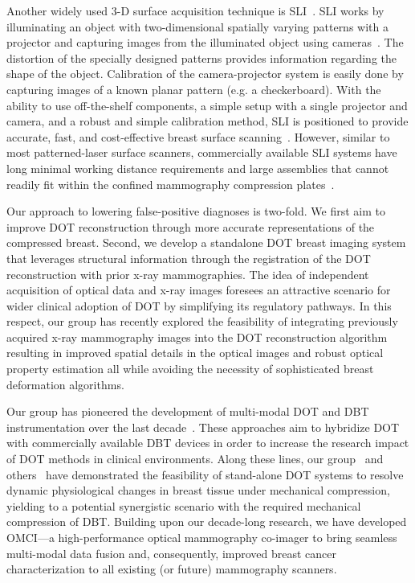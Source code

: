 Another widely used 3-D surface acquisition technique is \ac{SLI}~\cite{Yang2020, Zhang2018}. \ac{SLI} works by illuminating an object with two-dimensional spatially varying patterns with a projector and capturing images from the illuminated object using cameras~\cite{Geng2011}. The distortion of the specially designed patterns provides information regarding the shape of the object. Calibration of the camera-projector system is easily done by capturing images of a known planar pattern (e.g. a checkerboard). With the ability to use off-the-shelf components, a simple setup with a single projector and camera, and a robust and simple calibration method, \ac{SLI} is positioned to provide accurate, fast, and cost-effective breast surface scanning~\cite{Yang2020}. However, similar to most patterned-laser surface scanners, commercially available \ac{SLI} systems have long minimal working distance requirements and large assemblies that cannot readily fit within the confined mammography compression plates~\cite{Zhang2018, Rodriguez2017}.

Our approach to lowering false-positive diagnoses is two-fold. We first aim to improve \ac{DOT} reconstruction through more accurate representations of the compressed breast. Second, we develop a standalone \ac{DOT} breast imaging system that leverages structural information through the registration of the \ac{DOT} reconstruction with prior x-ray mammographies. The idea of independent acquisition of optical data and x-ray images foresees an attractive scenario for wider clinical adoption of \ac{DOT} by simplifying its regulatory pathways. In this respect, our group has recently explored the feasibility of integrating previously acquired x-ray mammography images into the \ac{DOT} reconstruction algorithm~\cite{Deng2015} resulting in improved spatial details in the optical images and robust optical property estimation all while avoiding the necessity of sophisticated breast deformation algorithms\cite{Azar2007}.

Our group has pioneered the development of multi-modal \ac{DOT} and \ac{DBT} instrumentation over the last decade~\cite{Fang2009,Zimmermann2017}. These approaches aim to hybridize \ac{DOT} with commercially available \ac{DBT} devices in order to increase the research impact of \ac{DOT} methods in clinical environments. Along these lines, our group~\cite{Carp2006,Carp2008,Carp2013} and others~\cite{Wang2008,Fournier2009,Alabdi2011} have demonstrated the feasibility of stand-alone \ac{DOT} systems to resolve dynamic physiological changes in breast tissue under mechanical compression, yielding to a potential synergistic scenario with the required mechanical compression of \ac{DBT}. Building upon our decade-long research, we have developed \ac{OMCI}---a high-performance optical mammography co-imager to bring seamless multi-modal data fusion and, consequently, improved breast cancer characterization to all existing (or future) mammography scanners. 


